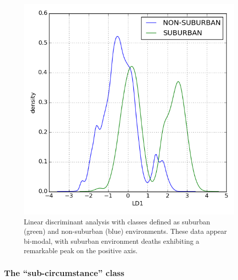 \documentclass{evanarticle}
\begin{document}
\begin{figure}[H]
  \centering
    \includegraphics[width=\linewidth]{images/suburban/suburban.png}
  \caption{Linear discriminant analysis with classes defined as suburban (green) and non-suburban (blue) environments.  These data appear bi-modal, with suburban environment deaths exhibiting a remarkable peak on the positive axis.}
  \label{fig_suburban}
\end{figure}

\subsubsection{The ``sub-circumstance'' class}
\end{document}
